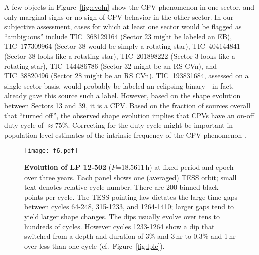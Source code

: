 \documentclass[11pt,twocolumn,tighten]{aastex63}
\begin{document}
A few objects in Figure~\ref{fig:evoln} show the CPV phenomenon in one
sector, and only marginal signs or no sign of CPV behavior in the other
sector.  In our subjective assessment, cases for which at least one
sector would be flagged as ``ambiguous'' include
TIC~368129164 (Sector 23 might be labeled an EB),
TIC~177309964 (Sector 38 would be simply a rotating star),
TIC~404144841 (Sector 38 looks like a rotating star),
TIC~201898222 (Sector 3 looks like a rotating star),
TIC~144486786 (Sector 32 might be an RS CVn),
and
TIC~38820496 (Sector 28 might be an RS CVn).
TIC~193831684, assessed on a single-sector basis, would probably be
labeled an eclipsing binary---in fact, \citet{2021ApJ...912..123J}
already gave this source such a label.  However, based on the shape
evolution between Sectors 13 and 39, it is a CPV.  Based on the
fraction of sources overall that ``turned off'', the observed shape
evolution implies that CPVs have an on-off duty cycle of $\approx$75\%.
Correcting for the duty cycle might be important in population-level
estimates of the intrinsic frequency of the CPV phenomenon
\citep[e.g.][]{2022AJ....163..144G}.



\begin{figure*}[!t]
	\begin{center}
		\centering
		\texttt{[image: f6.pdf]}
		\vspace{-0.3cm}
		\caption{
			{\bf Evolution of LP 12-502} ($P$=18.5611\,h) at fixed period and
      epoch over three years.  Each panel shows one (averaged) TESS
			orbit; small text denotes relative cycle number.  There are 200
			binned black points per cycle.  The TESS pointing law dictates
			the large time gaps between cycles 64-248, 315-1233, and
			1264-1410; larger gaps tend to yield larger shape changes.  The
			dips usually evolve over tens to hundreds of cycles.  However
			cycles 1233-1264 show a dip that switched from a depth and
			duration of 3\% and 3\,hr to 0.3\% and 1\,hr over less than one
			cycle (cf.~Figure~\ref{fig:lplc}).
		}
		\label{fig:lp}
	\end{center}
\end{figure*}

\end{document}
